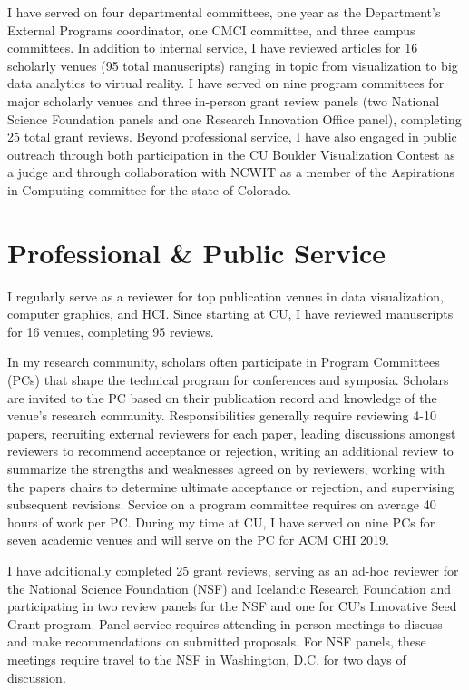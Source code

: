 \documentclass[11pt]{article}
\begin{document}
I have served on four departmental committees, one year as the Department's External Programs coordinator, one CMCI committee, and three campus committees. In addition to internal service, I have reviewed articles for 16 scholarly venues (95 total manuscripts) ranging in topic from visualization to big data analytics to virtual reality. I have served on nine program committees for major scholarly venues and three in-person grant review panels (two National Science Foundation panels and one Research Innovation Office panel), completing 25 total grant reviews. 
Beyond professional service, I have also engaged in public outreach through both participation in the CU Boulder Visualization Contest as a judge and through collaboration with NCWIT as a member of the Aspirations in Computing committee for the state of Colorado. 



\section*{Professional \& Public Service}
I regularly serve as a reviewer for top publication venues in data visualization, computer graphics, and HCI. Since starting at CU, I have reviewed manuscripts for 16 venues, completing 95 reviews. 

In my research community, scholars often participate in Program Committees (PCs) that shape the technical program for conferences and symposia. Scholars are invited to the PC based on their publication record and knowledge of the venue's research community. Responsibilities generally require reviewing 4-10 papers, recruiting external reviewers for each paper, leading discussions amongst reviewers to recommend acceptance or rejection, writing an additional review to summarize the strengths and weaknesses agreed on by reviewers, working with the papers chairs to determine ultimate acceptance or rejection, and supervising subsequent revisions. Service on a program committee requires on average 40 hours of work per PC. During my time at CU, I have served on nine PCs for seven academic venues and will serve on the PC for ACM CHI 2019. 

I have additionally completed 25 grant reviews, serving as an ad-hoc reviewer for the National Science Foundation (NSF) and Icelandic Research Foundation and participating in two review panels for the NSF and one for CU's Innovative Seed Grant program. Panel service requires attending in-person meetings to discuss and make recommendations on submitted proposals. For NSF panels, these meetings require travel to the NSF in Washington, D.C. for two days of discussion. 
\end{document}

